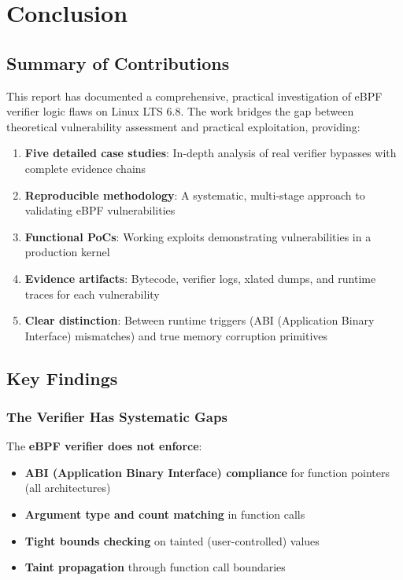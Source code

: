 \chapter{Conclusion}
\label{ch:conclusion}

\section{Summary of Contributions}

This report has documented a comprehensive, practical investigation of eBPF verifier logic flaws on Linux LTS 6.8. The work bridges the gap between theoretical vulnerability assessment and practical exploitation, providing:

\begin{enumerate}[label=\arabic*.]
  \item \textbf{Five detailed case studies}: In-depth analysis of real verifier bypasses with complete evidence chains
  \item \textbf{Reproducible methodology}: A systematic, multi-stage approach to validating eBPF vulnerabilities
  \item \textbf{Functional PoCs}: Working exploits demonstrating vulnerabilities in a production kernel
  \item \textbf{Evidence artifacts}: Bytecode, verifier logs, xlated dumps, and runtime traces for each vulnerability
  \item \textbf{Clear distinction}: Between runtime triggers (ABI (Application Binary Interface) mismatches) and true memory corruption primitives
\end{enumerate}

\section{Key Findings}

\subsection{The Verifier Has Systematic Gaps}

The \textbf{eBPF verifier does not enforce}:
\begin{itemize}
  \item \textbf{ABI (Application Binary Interface) compliance} for function pointers (all architectures)
  \item \textbf{Argument type and count matching} in function calls
  \item \textbf{Tight bounds checking} on tainted (user-controlled) values
  \item \textbf{Taint propagation} through function call boundaries
\end{itemize}


